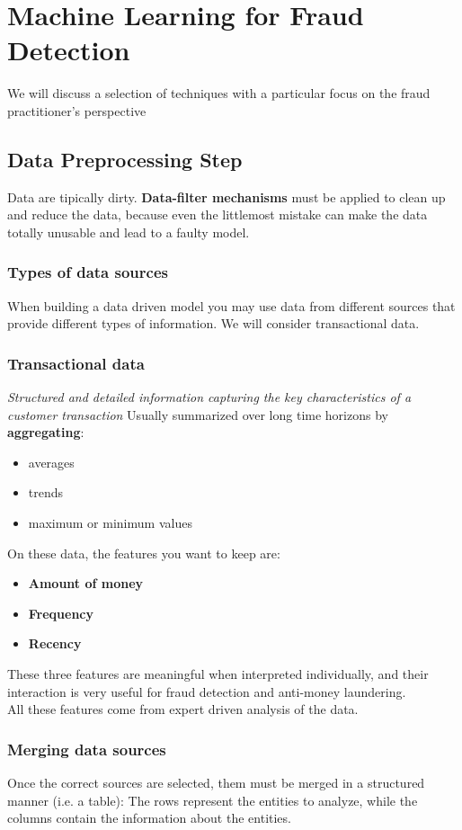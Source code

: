 \chapter{Machine Learning for Fraud Detection}
    We will discuss a selection of techniques with a particular focus on the fraud practitioner's perspective
    \section{Data Preprocessing Step}
        Data are tipically dirty. \textbf{Data-filter mechanisms} must be applied to clean up and reduce the data, because even the littlemost mistake can make the data totally unusable and lead to a faulty model.
        \subsection{Types of data sources}
            When building a data driven model you may use data from different sources that provide different types of information. We will consider transactional data.
        \subsection{Transactional data}
            \textit{Structured and detailed information capturing the key characteristics of a customer transaction}
            Usually summarized over long time horizons by \textbf{aggregating}:
            \begin{itemize}
                \item averages
                \item trends 
                \item maximum or minimum values
            \end{itemize}
            On these data, the features you want to keep are:
            \begin{itemize}
                \item \textbf{Amount of money}
                \item \textbf{Frequency}
                \item \textbf{Recency}
            \end{itemize}
            These three features are meaningful when interpreted individually, and their interaction is very useful for fraud detection and anti-money laundering.\\
            All these features come from expert driven analysis of the data.
        \subsection{Merging data sources}
            Once the correct sources are selected, them must be merged in a structured manner (i.e. a table):
            The rows represent the entities to analyze, while the columns contain the information about the entities.
